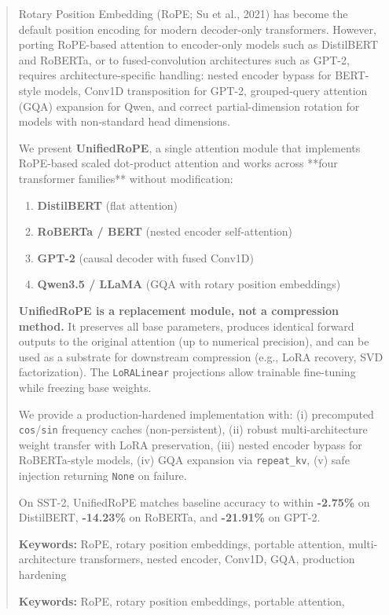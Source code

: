 \documentclass{article}
\begin{document}
\maketitle

\begin{abstract}
Rotary Position Embedding (RoPE; Su et al., 2021) has become the default 
position encoding for modern decoder-only transformers. However, porting 
RoPE-based attention to encoder-only models such as DistilBERT and 
RoBERTa, or to fused-convolution architectures such as GPT-2, requires 
architecture-specific handling: nested encoder bypass for BERT-style 
models, Conv1D transposition for GPT-2, grouped-query attention (GQA) 
expansion for Qwen, and correct partial-dimension rotation for models with 
non-standard head dimensions.

We present \textbf{UnifiedRoPE}, a single attention module that implements 
RoPE-based scaled dot-product attention and works across **four 
transformer families** without modification:

\begin{enumerate}
\item \textbf{DistilBERT} (flat attention)
\item \textbf{RoBERTa / BERT} (nested encoder self-attention)
\item \textbf{GPT-2} (causal decoder with fused Conv1D)
\item \textbf{Qwen3.5 / LLaMA} (GQA with rotary position embeddings)

\end{enumerate}
\textbf{UnifiedRoPE is a replacement module, not a compression method.} It 
preserves all base parameters, produces identical forward outputs to the 
original attention (up to numerical precision), and can be used as a 
substrate for downstream compression (e.g., LoRA recovery, SVD factorization). 
The \texttt{LoRALinear} projections allow trainable fine-tuning while freezing 
base weights.

We provide a production-hardened implementation with:
(i) precomputed \texttt{cos}/\texttt{sin} frequency caches (non-persistent),
(ii) robust multi-architecture weight transfer with LoRA preservation,
(iii) nested encoder bypass for RoBERTa-style models,
(iv) GQA expansion via \texttt{repeat\_kv},
(v) safe injection returning \texttt{None} on failure.

On SST-2, UnifiedRoPE matches baseline accuracy to within \textbf{-2.75\%} 
on DistilBERT, \textbf{-14.23\%} on RoBERTa, and \textbf{-21.91\%} on GPT-2.

\textbf{Keywords:} RoPE, rotary position embeddings, portable attention, 
multi-architecture transformers, nested encoder, Conv1D, GQA, production 
hardening



\vspace{0.5em}
\noindent\textbf{Keywords:} RoPE, rotary position embeddings, portable attention,
\end{abstract}
\end{document}
